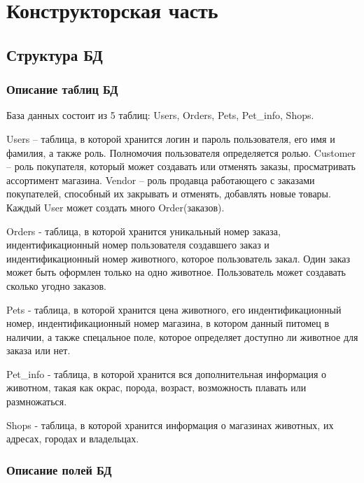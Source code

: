 \chapter{Конструкторская часть}

\section{Структура БД}

\subsection{Описание таблиц БД}

\hspace{0cm} База данных состоит из 5 таблиц: Users, Orders, Pets, Pet\_info, Shops.

\hspace{0cm} Users – таблица, в которой хранится логин и пароль пользователя, его имя и фамилия, а также роль. Полномочия пользователя определяется ролью. Customer – роль покупателя, который может создавать или отменять заказы, просматривать ассортимент магазина. Vendor – роль продавца работающего с заказами покупателей, способный их закрывать и отменять, добавлять новые товары. Каждый User может создать много Order(заказов).

\hspace{0cm} Orders - таблица, в которой хранится уникальный номер заказа, индентификационный номер пользователя создавшего заказ и индентификационный номер животного, которое пользователь закал. Один заказ может быть оформлен только на одно животное. Пользователь может создавать сколько угодно заказов.

\hspace{0cm} Pets - таблица, в которой хранится цена животного, его индентификационный номер, индентификационный номер магазина, в котором данный питомец в наличии, а также спецальное поле, которое определяет доступно ли животное для заказа или нет.

\hspace{0cm} Pet\_info - таблица, в которой хранится вся дополнительная информация о животном, такая как окрас, порода, возраст, возможность плавать или размножаться.

\hspace{0cm} Shops - таблица, в которой хранится информация о магазинах животных, их адресах, городах и владельцах.

\subsection{Описание полей БД}

